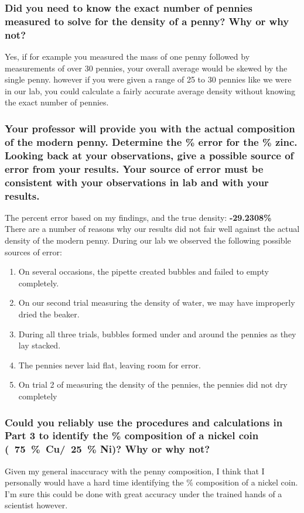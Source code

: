 \documentclass[a4paper,10pt]{article}
\begin{document}
  \subsubsection*{Did you need to know the exact number of pennies measured to solve for the density of a penny? Why or why not?}

    Yes, if for example you measured the mass of one penny followed by measurements of over 30 pennies, your overall average would be skewed by the single penny. however if you were given a range of 25 to 30 pennies like we were in our lab, you could calculate a fairly accurate average density without knowing the exact number of pennies. 

  \subsubsection*{Your professor will provide you with the actual composition of the modern penny. Determine the \% error for the \% zinc. Looking back at your observations, give a possible source of error from your results. Your source of error must be consistent with your observations in lab and with your results.}
    
    The percent error based on my findings, and the true density: \textbf{-29.2308\%} \\ 

    There are a number of reasons why our results did not fair well against the actual density of the modern penny. During our lab we observed the following possible sources of error: \\

   
      
    \begin{enumerate}
        \item On several occasions, the pipette created bubbles and failed to empty completely. 
        \item On our second trial measuring the density of water, we may have improperly dried the beaker.
        \item During all three trials, bubbles formed under and around the pennies as they lay stacked.
        \item The pennies never laid flat, leaving room for error.
        \item On trial 2 of measuring the density of the pennies, the pennies did not dry completely
      \end{enumerate}

  \subsubsection*{Could you reliably use the procedures and calculations in Part 3 to identify the \% composition of a nickel coin (~75~\%~Cu/~25~\% Ni)? Why or why not?}
      Given my general inaccuracy with the penny composition, I think that I personally would have a hard time identifying the \% composition of a nickel coin. I'm sure this could be done with great accuracy under the trained hands of a scientist however.  
\end{document}
